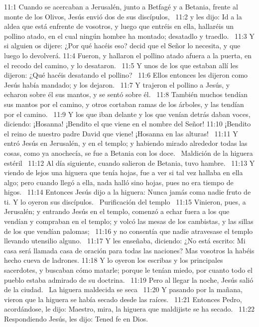 11:1 Cuando se acercaban a Jerusalén, junto a Betfagé y a Betania, frente al monte de los Olivos, Jesús envió dos de sus discípulos,  
11:2 y les dijo: Id a la aldea que está enfrente de vosotros, y luego que entréis en ella, hallaréis un pollino atado, en el cual ningún hombre ha montado; desatadlo y traedlo.  
11:3 Y si alguien os dijere: ¿Por qué hacéis eso? decid que el Señor lo necesita, y que luego lo devolverá. 
11:4 Fueron, y hallaron el pollino atado afuera a la puerta, en el recodo del camino, y lo desataron.  
11:5 Y unos de los que estaban allí les dijeron: ¿Qué hacéis desatando el pollino?  
11:6 Ellos entonces les dijeron como Jesús había mandado; y los dejaron.  
11:7 Y trajeron el pollino a Jesús, y echaron sobre él sus mantos, y se sentó sobre él.  
11:8 También muchos tendían sus mantos por el camino, y otros cortaban ramas de los árboles, y las tendían por el camino.  
11:9 Y los que iban delante y los que venían detrás daban voces, diciendo: ¡Hosanna! ¡Bendito el que viene en el nombre del Señor! 
11:10 ¡Bendito el reino de nuestro padre David que viene! ¡Hosanna en las alturas!  
11:11 Y entró Jesús en Jerusalén, y en el templo; y habiendo mirado alrededor todas las cosas, como ya anochecía, se fue a Betania con los doce.  
Maldición de la higuera estéril   
11:12 Al día siguiente, cuando salieron de Betania, tuvo hambre.  
11:13 Y viendo de lejos una higuera que tenía hojas, fue a ver si tal vez hallaba en ella algo; pero cuando llegó a ella, nada halló sino hojas, pues no era tiempo de higos.  
11:14 Entonces Jesús dijo a la higuera: Nunca jamás coma nadie fruto de ti. Y lo oyeron sus discípulos.  
Purificación del templo   
11:15 Vinieron, pues, a Jerusalén; y entrando Jesús en el templo, comenzó a echar fuera a los que vendían y compraban en el templo; y volcó las mesas de los cambistas, y las sillas de los que vendían palomas;  
11:16 y no consentía que nadie atravesase el templo llevando utensilio alguno.  
11:17 Y les enseñaba, diciendo: ¿No está escrito: Mi casa será llamada casa de oración para todas las naciones? Mas vosotros la habéis hecho cueva de ladrones. 
11:18 Y lo oyeron los escribas y los principales sacerdotes, y buscaban cómo matarle; porque le tenían miedo, por cuanto todo el pueblo estaba admirado de su doctrina.  
11:19 Pero al llegar la noche, Jesús salió de la ciudad.  
La higuera maldecida se seca   
11:20 Y pasando por la mañana, vieron que la higuera se había secado desde las raíces.  
11:21 Entonces Pedro, acordándose, le dijo: Maestro, mira, la higuera que maldijiste se ha secado.  
11:22 Respondiendo Jesús, les dijo: Tened fe en Dios.  
